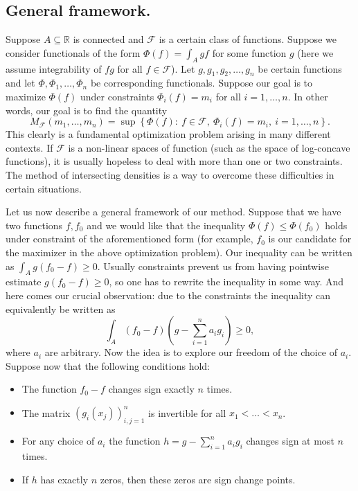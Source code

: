 \documentclass[11pt]{amsart}
\newcommand{\mc}[1]{\mathcal{{#1}}}
\newcommand{\1}{\mathbf{1}}
\newcommand{\R}{\mathbb{R}}
\theoremstyle{definition}
\theoremstyle{definition}
\theoremstyle{remark}
\begin{document}
\subsection{General framework.} Suppose $A \subseteq \R$ is connected and $\mc{F}$ is a certain class of functions. Suppose we consider functionals  of the form $\Phi(f) = \int_A gf$ for some function $g$ (here we assume integrability of $fg$ for all $f \in \mc{F}$). Let $g, g_1, g_2, \ldots, g_n$ be certain functions and let $\Phi, \Phi_1,\ldots, \Phi_n$ be corresponding functionals. Suppose our goal is to maximize $\Phi(f)$ under constraints $\Phi_i(f)=m_i$ for all $i=1,\ldots, n$. In other words, our goal is to find the quantity
\[
	M_{\mc{F}}(m_1,\ldots, m_n) = \sup \left\{\Phi(f): \ f \in \mc{F}, \ \Phi_i(f)=m_i, \ i=1, \ldots, n\right\}.
\]
This clearly is a fundamental optimization problem arising in many different contexts. If $\mc{F}$ is a non-linear spaces of function (such as the space of log-concave functions), it is usually hopeless to deal with more than one or two constraints. The method of intersecting densities is a way to overcome these difficulties in certain situations. 

Let us now describe a general framework of our  method. Suppose  that we have two functions $f,f_0$ and we would like that the inequality $\Phi(f) \leq \Phi(f_0)$ holds under constraint of the aforementioned form (for example, $f_0$ is our candidate for the maximizer in the above optimization problem).  Our inequality can be written as $\int_A g(f_0-f) \geq 0$. Usually constraints prevent us from having pointwise estimate $g(f_0-f) \geq 0$, so one has to rewrite the inequality in some way. And here comes our crucial observation: due to the constraints the inequality can equivalently be written as
\[
 	\int_A (f_0-f)\left(g- \sum_{i=1}^n a_i g_i \right) \geq 0,  
\]      
where $a_i$ are arbitrary. Now the idea is to explore our freedom of the choice of $a_i$. Suppose now that the following  conditions hold:

\begin{itemize}
\item[(I)] The function $f_0-f$ changes sign exactly $n$ times.
\item[(II)] The matrix $(g_i(x_j))_{i,j=1}^n$ is invertible for all $x_1<\ldots <x_n$. 
\item[(IIIa)] For any choice of $a_i$ the function $h=g- \sum_{i=1}^n a_i g_i$ changes sign at most $n$ times.
\item[(IIIb)] If $h$ has exactly $n$ zeros, then these zeros are sign change points. 
\end{itemize}
\end{document}

